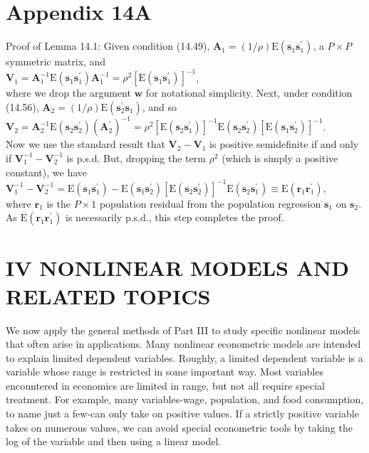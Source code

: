 \documentclass[10pt]{article}
\begin{document}
\section*{Appendix 14A}
Proof of Lemma 14.1: Given condition (14.49), $\mathbf{A}_{1}=(1 / \rho) \mathrm{E}\left(\mathbf{s}_{1} \mathbf{s}_{1}^{\prime}\right)$, a $P \times P$ symmetric matrix, and\\
$\mathbf{V}_{1}=\mathbf{A}_{1}^{-1} \mathrm{E}\left(\mathbf{s}_{1} \mathbf{s}_{1}^{\prime}\right) \mathbf{A}_{1}^{-1}=\rho^{2}\left[\mathrm{E}\left(\mathbf{s}_{1} \mathbf{s}_{1}^{\prime}\right)\right]^{-1}$,\\
where we drop the argument $\mathbf{w}$ for notational simplicity. Next, under condition (14.56), $\mathbf{A}_{2}=(1 / \rho) \mathrm{E}\left(\mathbf{s}_{2}^{\prime} \mathbf{s}_{1}\right)$, and so\\
$\mathbf{V}_{2}=\mathbf{A}_{2}^{-1} \mathrm{E}\left(\mathbf{s}_{2} \mathbf{s}_{2}^{\prime}\right)\left(\mathbf{A}_{2}^{\prime}\right)^{-1}=\rho^{2}\left[\mathrm{E}\left(\mathbf{s}_{2} \mathbf{s}_{1}^{\prime}\right)\right]^{-1} \mathrm{E}\left(\mathbf{s}_{2} \mathbf{s}_{2}^{\prime}\right)\left[\mathrm{E}\left(\mathbf{s}_{1} \mathbf{s}_{2}^{\prime}\right)\right]^{-1}$.\\
Now we use the standard result that $\mathbf{V}_{2}-\mathbf{V}_{1}$ is positive semidefinite if and only if $\mathbf{V}_{1}^{-1}-\mathbf{V}_{2}^{-1}$ is p.s.d. But, dropping the term $\rho^{2}$ (which is simply a positive constant), we have\\
$\mathbf{V}_{1}^{-1}-\mathbf{V}_{2}^{-1}=\mathrm{E}\left(\mathbf{s}_{1} \mathbf{s}_{1}^{\prime}\right)-\mathrm{E}\left(\mathbf{s}_{1} \mathbf{s}_{2}^{\prime}\right)\left[\mathrm{E}\left(\mathbf{s}_{2} \mathbf{s}_{2}^{\prime}\right)\right]^{-1} \mathrm{E}\left(\mathbf{s}_{2} \mathbf{s}_{1}^{\prime}\right) \equiv \mathrm{E}\left(\mathbf{r}_{1} \mathbf{r}_{1}^{\prime}\right)$,\\
where $\mathbf{r}_{1}$ is the $P \times 1$ population residual from the population regression $\mathbf{s}_{1}$ on $\mathbf{s}_{2}$. As $\mathrm{E}\left(\mathbf{r}_{1} \mathbf{r}_{1}^{\prime}\right)$ is necessarily p.s.d., this step completes the proof.

\section*{IV NONLINEAR MODELS AND RELATED TOPICS}
We now apply the general methods of Part III to study specific nonlinear models that often arise in applications. Many nonlinear econometric models are intended to explain limited dependent variables. Roughly, a limited dependent variable is a variable whose range is restricted in some important way. Most variables encountered in economics are limited in range, but not all require special treatment. For example, many variables-wage, population, and food consumption, to name just a few-can only take on positive values. If a strictly positive variable takes on numerous values, we can avoid special econometric tools by taking the log of the variable and then using a linear model.
\end{document}
